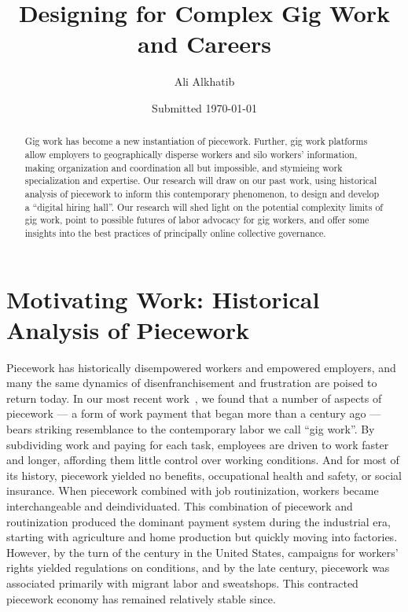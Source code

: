 \documentclass{article}
\title{Designing for Complex Gig Work and Careers}
\author{Ali Alkhatib}
\date{Submitted \today}
\newcommand{\topic}[1]{{\color{Blue}#1}}
\begin{document}
  \begin{abstract}
Gig work has become a new instantiation of piecework.
Further, gig work platforms allow employers to geographically disperse workers and silo workers' information,
making organization and coordination all but impossible,
and stymieing work specialization and expertise.
Our research will draw on our past work, using historical analysis of piecework to inform this contemporary phenomenon,
to design and develop a ``digital hiring hall''.
Our research will
shed light on the potential complexity limits of gig work,
point to possible futures of labor advocacy for gig workers,
and offer some insights into the best practices of principally online collective governance.


  \end{abstract}


\section*{Motivating Work: Historical Analysis of Piecework}
\topic{Piecework has historically disempowered workers and empowered employers, and
many the same dynamics of disenfranchisement and frustration are poised to return today.}
In our most recent work~\cite{pieceworkCrowdworkGigwork}, we found that a number of aspects of piecework
--- a form of work payment that began more than a century ago ---
bears striking resemblance to the contemporary labor we call ``gig work''.
By subdividing work and paying for each task, employees are driven to work faster and longer,
affording them little control over working conditions.
And for most of its history, piecework yielded no benefits, occupational health and safety, or social insurance.
When piecework combined with job routinization, workers became interchangeable and deindividuated.
This combination of piecework and routinization produced the dominant payment system during the industrial era,
starting with agriculture and home production but quickly moving into factories.
However, by the turn of the  century in the United States,
campaigns for workers' rights yielded regulations on conditions, and by the late  century,
piecework was associated primarily with migrant labor and sweatshops.
This contracted piecework economy has remained relatively stable since.
\end{document}
